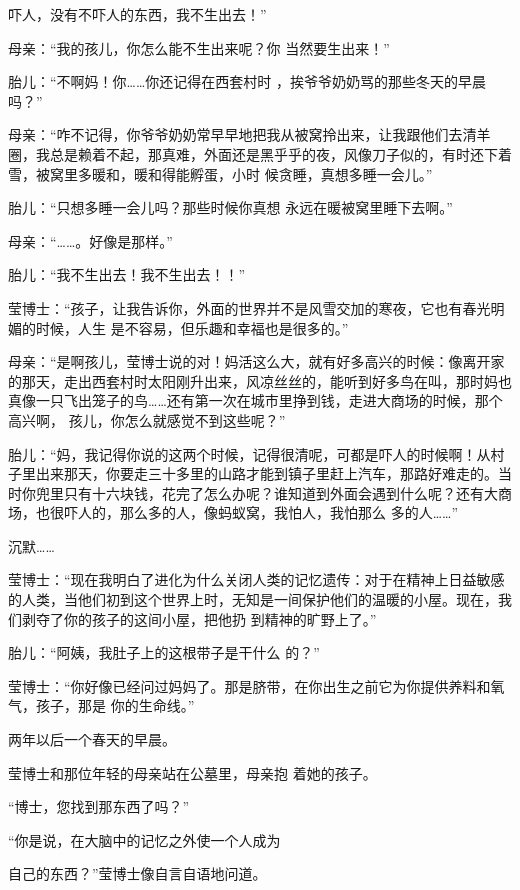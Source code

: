 \documentclass{article}
\begin{document}
吓人，没有不吓人的东西，我不生出去！” 

母亲：“我的孩儿，你怎么能不生出来呢？你
当然要生出来！” 

胎儿：“不啊妈！你……你还记得在西套村时
，挨爷爷奶奶骂的那些冬天的早晨吗？” 

母亲：“咋不记得，你爷爷奶奶常早早地把我从被窝拎出来，让我跟他们去清羊圈，我总是赖着不起，那真难，外面还是黑乎乎的夜，风像刀子似的，有时还下着雪，被窝里多暖和，暖和得能孵蛋，小时
候贪睡，真想多睡一会儿。” 

胎儿：“只想多睡一会儿吗？那些时候你真想
永远在暖被窝里睡下去啊。” 


母亲：“……。好像是那样。” 


胎儿：“我不生出去！我不生出去！！” 

\newpage

莹博士：“孩子，让我告诉你，外面的世界并不是风雪交加的寒夜，它也有春光明媚的时候，人生
是不容易，但乐趣和幸福也是很多的。” 

母亲：“是啊孩儿，莹博士说的对！妈活这么大，就有好多高兴的时候：像离开家的那天，走出西套村时太阳刚升出来，风凉丝丝的，能听到好多鸟在叫，那时妈也真像一只飞出笼子的鸟……还有第一次在城市里挣到钱，走进大商场的时候，那个高兴啊，
孩儿，你怎么就感觉不到这些呢？” 

胎儿：“妈，我记得你说的这两个时候，记得很清呢，可都是吓人的时候啊！从村子里出来那天，你要走三十多里的山路才能到镇子里赶上汽车，那路好难走的。当时你兜里只有十六块钱，花完了怎么办呢？谁知道到外面会遇到什么呢？还有大商场，也很吓人的，那么多的人，像蚂蚁窝，我怕人，我怕那么
多的人……” 


沉默…… 

\newpage

莹博士：“现在我明白了进化为什么关闭人类的记忆遗传：对于在精神上日益敏感的人类，当他们初到这个世界上时，无知是一间保护他们的温暖的小屋。现在，我们剥夺了你的孩子的这间小屋，把他扔
到精神的旷野上了。” 

胎儿：“阿姨，我肚子上的这根带子是干什么
的？” 

莹博士：“你好像已经问过妈妈了。那是脐带，在你出生之前它为你提供养料和氧气，孩子，那是
你的生命线。” 


两年以后一个春天的早晨。 

莹博士和那位年轻的母亲站在公墓里，母亲抱
着她的孩子。 


“博士，您找到那东西了吗？” 

“你是说，在大脑中的记忆之外使一个人成为
\newpage

自己的东西？”莹博士像自言自语地问道。 
\end{document}
